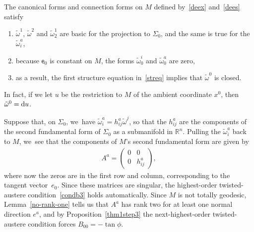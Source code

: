 \documentclass[pdftex]{sigma}
\def\R{\mathbb{R}}
\def\ve{\mathsf{e}}
\def\wt{\tilde\omega}
\numberwithin{equation}{section}
\begin{document}
The canonical forms and connection forms on $M$ defined by~\eqref{deex} and~\eqref{dees} satisfy
\begin{enumerate}[$(i)$]\itemsep=0pt
\item $\wt^1$, $\wt^2$ and $\wt^1_2$ are basic for the projection to $\Sigma_0$, and the same is true for the $\wt^a_i$,
\item because $\ve_0$ is constant on $M$, the forms $\wt^i_0$ and $\wt^a_0$ are zero,
\item as a result, the first structure equation in~\eqref{streq} implies that $\wt^0$ is closed.
\end{enumerate}
In fact, if we let $u$ be the restriction to $M$ of the ambient coordinate $x^0$, then $\wt^0={\rm d}u$.

Suppose that, on $\Sigma_0$, we~have $\wt^a_i = h^a_{ij} \wt^j$, so that the $h^a_{ij}$ are the components of the second fundamental form of $\Sigma_0$ as a submanifold in $\R^n$. Pulling the $\wt^a_i$ back to $M$, we~see that the components of $M$'s second fundamental form are given by
\begin{gather} \label{cylinderAform}
A^a = \begin{pmatrix} 0 & 0 \\ 0 & h^a_{ij} \end{pmatrix},
\end{gather}
where now the zeros are in the first row and column, corresponding to the tangent vector~$e_0$. Since these matrices are singular, the highest-order twisted-austere condition~\eqref{condb3} holds automatically. Since $M$ is not totally geodesic, Lemma~\ref{no-rank-one} tells us that $A^a$ has rank two for at least one normal direction $e^a$, and by Proposition~\ref{thm1step3} the next-highest-order twisted-austere condition forces $B_{00}=-\tan\phi$.
\end{document}
